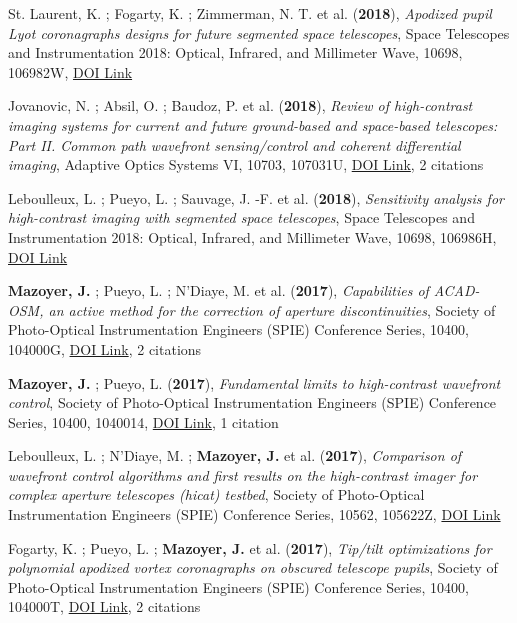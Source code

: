 \documentclass[11pt]{article}
\begin{document}
\begin{etaremune}
\item St. Laurent, K. ; Fogarty, K. ; Zimmerman, N. T. et al. ({\bf2018}), {\it Apodized pupil Lyot coronagraphs designs for future segmented space telescopes}, Space Telescopes and Instrumentation 2018: Optical, Infrared, and Millimeter Wave, 10698, 106982W, \href{https://doi.org/10.1117/12.2313902}{DOI Link}

\item Jovanovic, N. ; Absil, O. ; Baudoz, P. et al. ({\bf2018}), {\it Review of high-contrast imaging systems for current and future ground-based and space-based telescopes: Part II. Common path wavefront sensing/control and coherent differential imaging}, Adaptive Optics Systems VI, 10703, 107031U, \href{https://doi.org/10.1117/12.2314260}{DOI Link}, 2 citations

\item Leboulleux, L. ; Pueyo, L. ; Sauvage, J. -F. et al. ({\bf2018}), {\it Sensitivity analysis for high-contrast imaging with segmented space telescopes}, Space Telescopes and Instrumentation 2018: Optical, Infrared, and Millimeter Wave, 10698, 106986H, \href{https://doi.org/10.1117/12.2313904}{DOI Link}

\item {\bf Mazoyer, J.} ; Pueyo, L. ; N'Diaye, M. et al. ({\bf2017}), {\it Capabilities of ACAD-OSM, an active method for the correction of aperture discontinuities}, Society of Photo-Optical Instrumentation Engineers (SPIE) Conference Series, 10400, 104000G, \href{https://doi.org/10.1117/12.2273070}{DOI Link}, 2 citations

\item {\bf Mazoyer, J.} ; Pueyo, L. ({\bf2017}), {\it Fundamental limits to high-contrast wavefront control}, Society of Photo-Optical Instrumentation Engineers (SPIE) Conference Series, 10400, 1040014, \href{https://doi.org/10.1117/12.2274657}{DOI Link}, 1 citation

\item Leboulleux, L. ; N'Diaye, M. ; {\bf Mazoyer, J.} et al. ({\bf2017}), {\it Comparison of wavefront control algorithms and first results on the high-contrast imager for complex aperture telescopes (hicat) testbed}, Society of Photo-Optical Instrumentation Engineers (SPIE) Conference Series, 10562, 105622Z, \href{https://doi.org/10.1117/12.2296154}{DOI Link}

\item Fogarty, K. ; Pueyo, L. ; {\bf Mazoyer, J.} et al. ({\bf2017}), {\it Tip/tilt optimizations for polynomial apodized vortex coronagraphs on obscured telescope pupils}, Society of Photo-Optical Instrumentation Engineers (SPIE) Conference Series, 10400, 104000T, \href{https://doi.org/10.1117/12.2274603}{DOI Link}, 2 citations


\end{etaremune}
\end{document}
